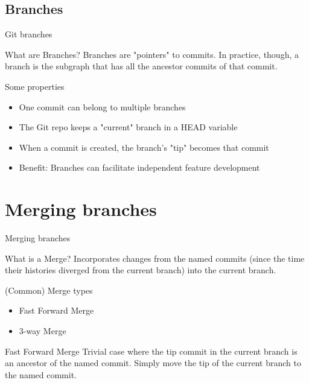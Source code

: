 \documentclass{beamer}
\begin{document}


\subsection{Branches}

\begin{frame}{Git branches}
  \begin{block}{What are Branches?}
    Branches are "pointers" to commits. In practice, though, a branch is the subgraph that has all the ancestor commits of that commit.
  \end{block}
  \begin{block}{Some properties}
    \begin{itemize}
      \item One commit can belong to multiple branches
      \item The Git repo keeps a "current" branch in a HEAD variable
      \item When a commit is created, the branch's "tip" becomes that commit
      \item Benefit: Branches can facilitate independent feature development
    \end{itemize}
  \end{block}
\end{frame}

\section{Merging branches}

\begin{frame}{Merging branches}
  \begin{block}{What is a Merge?}
    Incorporates changes from the named commits (since the time their histories diverged from the current branch) into the current branch.
  \end{block}
  \begin{block}{(Common) Merge types}
    \begin{itemize}
      \item Fast Forward Merge
      \item 3-way Merge
    \end{itemize}
  \end{block}
  \begin{block}{Fast Forward Merge}
    Trivial case where the tip commit in the current branch is an ancestor of the named commit. Simply move the tip of the current branch to the named commit.
  \end{block}
\end{frame}
\end{document}
